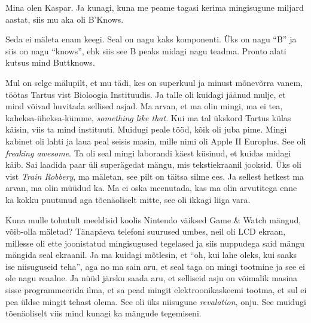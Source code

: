 

Mina olen Kaspar. Ja kunagi, kuna me peame tagasi kerima mingisugune miljard aastat, siis mu aka oli B'Knows. 


Seda ei mäleta enam keegi. Seal on nagu kaks komponenti. Üks on nagu \enquote{B} ja siis on nagu \enquote{knows}, ehk siis see B peaks  midagi nagu teadma. Pronto alati kutsus mind Buttknows.


Mul on selge mälupilt, et mu tädi, kes on superkuul ja minust mõnevõrra vanem, töötas Tartus
vist Bioloogia Instituudis. Ja  talle oli kuidagi jäänud mulje, et mind võivad huvitada sellised asjad. Ma arvan, et ma olin mingi, ma ei tea, kaheksa-üheksa-kümme, \emph{something like that}. Kui ma tal ükskord Tartus külas käisin, viis ta mind instituuti. Muidugi peale tööd, kõik oli juba pime. Mingi kabinet oli lahti ja laua peal seisis masin, mille nimi oli Apple II Europlus. See oli \emph{freaking awesome}. Ta oli seal mingi laborandi käest küsinud, et kuidas  midagi käib. Sai laadida paar üli superägedat mängu, mis tekstiekraanil jooksid. Üks oli vist \emph{Train Robbery}, ma mäletan, see pilt on täitsa silme ees. Ja sellest hetkest ma arvan, ma olin müüdud ka. Ma ei oska  meenutada, kas ma olin arvutitega enne ka kokku puutunud aga tõenäoliselt mitte, see oli ikkagi liiga  vara. 

Kuna mulle tohutult meeldisid koolis Nintendo väiksed Game \& Watch mängud, võib-olla mäletad? Tänapäeva telefoni suurused umbes, neil oli LCD ekraan, millesse oli ette joonistatud mingisugused tegelased ja siis nuppudega said mängu mängida seal ekraanil. Ja  ma kuidagi mõtlesin, et \enquote{oh, kui lahe oleks, kui saaks ise niisuguseid teha}, aga no ma sain aru, et seal taga on mingi tootmine ja see ei ole nagu reaalne. Ja nüüd järsku saada aru, et selliseid asju on võimalik  masina sisse programmeerida ilma, et sa pead mingit elektroonikaskeemi tootma, et sul ei pea üldse mingit tehast olema. See oli üks niisugune \emph{revalation}, onju. See muidugi  tõenäoliselt viis mind kunagi ka mängude tegemiseni. 


